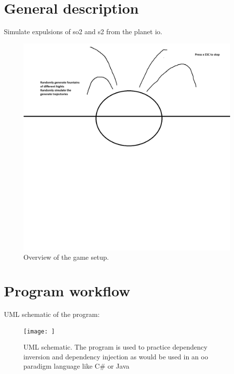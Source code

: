 \documentclass[12pt]{article}
\begin{document}
    \maketitle
    \section{General description}
    Simulate expulsions of so2 and s2 from the planet io.
    \begin{figure}
        \caption{Overview of the game setup.}
        \centering
        \includegraphics[scale=.4]{visuals.png}
    \end{figure}

    \section{Program workflow}
    UML schematic of the program:
    \begin{figure}
        \label{uml_scheme}
        \centering
        \caption{UML schematic. The program is used to practice dependency
            inversion and dependency injection as would be used in an oo 
            paradigm language like C\# or Java
        }
        \texttt{[image: ]}
    \end{figure}
\end{document}
